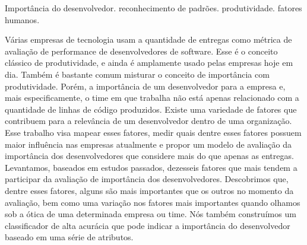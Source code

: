 \documentclass[dissertmst]{ppgco}
\begin{document}


\begin{resumo}{Importância do desenvolvedor. reconhecimento de padrões. produtividade. fatores humanos.}

 	 Várias empresas de tecnologia usam a quantidade de entregas como métrica de avaliação de performance de desenvolvedores de software. Esse é o conceito clássico de produtividade, e ainda é amplamente usado pelas empresas hoje em dia. Também é bastante comum misturar o conceito de importância com produtividade. Porém, a importância de um desenvolvedor para a empresa e, mais especificamente, o time em que trabalha não está apenas relacionado com a quantidade de linhas de código produzidos. Existe uma variedade de fatores que contribuem para a relevância de um desenvolvedor dentro de uma organização. Esse trabalho visa mapear esses fatores, medir quais dentre esses fatores possuem maior influência nas empresas atualmente e propor um modelo de avaliação da importância dos desenvolvedores que considere mais do que apenas as entregas. Levantamos, baseados em estudos passados, dezesseis fatores que mais tendem a participar da avaliação de importância dos desenvolvedores. Descobrimos que, dentre esses fatores, alguns são mais importantes que os outros no momento da avaliação, bem como uma variação nos fatores mais importantes quando olhamos sob a ótica de uma determinada empresa ou time. Nós também construímos um classificador de alta acurácia que pode indicar a importância do desenvolvedor baseado em uma série de atributos.
     
\end{resumo}
\end{document}
